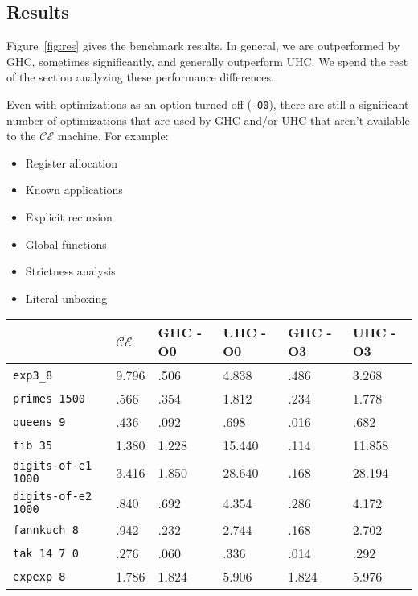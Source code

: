 \subsection{Results} \label{sec:res}

Figure~\ref{fig:res} gives the benchmark results.  In general, we are
outperformed by GHC, sometimes significantly, and generally outperform UHC. We
spend the rest of the section analyzing these performance differences.

Even with optimizations as an option turned off (\texttt{-O0}), there are still
a significant number of optimizations that are used by GHC and/or UHC that
aren't available to the $\mathcal{CE}$ machine. For example:

\begin{itemize}
\item Register allocation
\item Known applications
\item Explicit recursion
\item Global functions
\item Strictness analysis
\item Literal unboxing
\end{itemize}

\begin{figure*}
\centering
\begin{tabular}{l | l | l | l | l | l}
& $\mathcal{CE}$ & GHC -O0 & UHC -O0 & GHC -O3 & UHC -O3 \\
\hline
\texttt{exp3\_8} & 9.796 & .506 & 4.838 & .486 & 3.268 \\
\texttt{primes 1500} & .566 & .354 & 1.812 & .234 & 1.778 \\
\texttt{queens 9} & .436 & .092 & .698 & .016 & .682 \\
\texttt{fib 35} & 1.380 & 1.228 & 15.440 & .114 & 11.858 \\
\texttt{digits-of-e1 1000} & 3.416 & 1.850 & 28.640 & .168 & 28.194 \\
\texttt{digits-of-e2 1000} & .840 & .692 & 4.354 & .286 & 4.172 \\
\texttt{fannkuch 8} & .942 & .232 & 2.744 & .168 & 2.702 \\
\texttt{tak 14 7 0} & .276 & .060 & .336 & .014 & .292\\
\texttt{expexp 8} & 1.786 & 1.824 & 5.906 & 1.824 & 5.976 
\end{tabular}
\caption{Benchmark Results. Measurement is wall clock time, all units are
seconds. Times averaged over 5 runs}
\label{fig:res}
\end{figure*}

